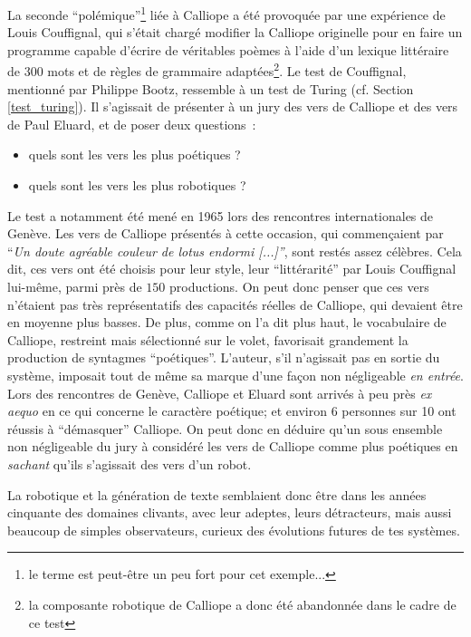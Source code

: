 \documentclass{article}
\begin{document}
					La seconde ``polémique''\footnote{le terme est peut-être un peu fort pour cet exemple...} liée à Calliope a été provoquée par une expérience de Louis Couffignal, qui s'était chargé modifier la Calliope originelle pour en faire un programme capable d'écrire de véritables poèmes à l'aide d'un lexique littéraire de $300$ mots et de règles de grammaire adaptées\footnote{la composante robotique de Calliope a donc été abandonnée dans le cadre de ce test}. Le test de Couffignal, mentionné par Philippe Bootz, ressemble à un test de Turing (cf. Section \ref{test_turing}). Il s'agissait de présenter à un jury des vers de Calliope et des vers de Paul Eluard, et de poser deux questions~:
					\begin{itemize}
						\item quels sont les vers les plus poétiques ?
						\item  quels sont les vers les plus robotiques ?
					\end{itemize}
					Le test a notamment été mené en 1965 lors des rencontres internationales de Genève. Les vers de Calliope présentés à cette occasion, qui commençaient par ``\textit{Un doute agréable couleur de lotus endormi [...]''}, sont restés assez célèbres. Cela dit, ces vers ont été choisis pour leur style, leur ``littérarité'' par Louis Couffignal lui-même, parmi près de $150$ productions. On peut donc penser que ces vers n'étaient pas très représentatifs des capacités réelles de Calliope, qui devaient être en moyenne plus basses. De plus, comme on l'a dit plus haut, le vocabulaire de Calliope, restreint mais sélectionné sur le volet, favorisait grandement la production de syntagmes ``poétiques''. L'auteur, s'il n'agissait pas en sortie du système, imposait tout de même sa marque d'une façon non négligeable \textit{en entrée}.\\
					
					Lors des rencontres de Genève, Calliope et Eluard sont arrivés à peu près \textit{ex aequo} en ce qui concerne le caractère poétique; et environ 6 personnes sur 10 ont réussis à ``démasquer'' Calliope. On peut donc en déduire qu'un sous ensemble non négligeable du jury à considéré les vers de Calliope comme plus poétiques en \textit{sachant} qu'ils s'agissait des vers d'un robot.
					
					La robotique et la génération de texte semblaient donc être dans les années cinquante des domaines clivants, avec leur adeptes, leurs détracteurs, mais aussi beaucoup de simples observateurs, curieux des évolutions futures de tes systèmes.\\
\end{document}
